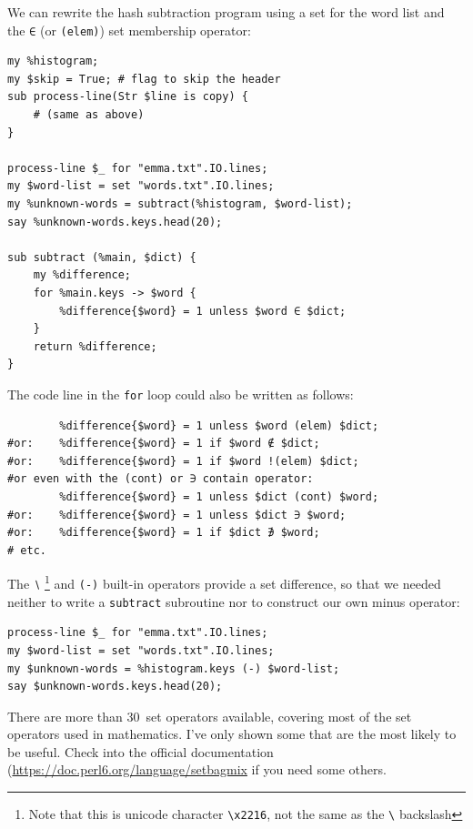 We can rewrite the hash subtraction program using a set for 
the word list and the  \verb'∈' (or \verb'(elem)') 
set membership operator:

\begin{verbatim}
my %histogram;
my $skip = True; # flag to skip the header
sub process-line(Str $line is copy) {
    # (same as above)
}

process-line $_ for "emma.txt".IO.lines; 
my $word-list = set "words.txt".IO.lines;
my %unknown-words = subtract(%histogram, $word-list);
say %unknown-words.keys.head(20);

sub subtract (%main, $dict) {
	my %difference;
	for %main.keys -> $word {
		%difference{$word} = 1 unless $word ∈ $dict;
	}
	return %difference;
}
\end{verbatim}

The code line in the {\tt for} loop could also be written as follows:

\begin{verbatim}
        %difference{$word} = 1 unless $word (elem) $dict;
#or:    %difference{$word} = 1 if $word ∉ $dict;
#or:    %difference{$word} = 1 if $word !(elem) $dict;
#or even with the (cont) or ∋ contain operator:
        %difference{$word} = 1 unless $dict (cont) $word;
#or:    %difference{$word} = 1 unless $dict ∋ $word;
#or:    %difference{$word} = 1 if $dict ∌ $word;
# etc.
\end{verbatim}

The \verb'∖' \footnote{Note that this is unicode character \verb'\x2216', 
not the same as the \verb'\' backslash} and \verb'(-)' built-in operators 
provide a set difference, so that we needed neither to write a 
{\tt subtract} subroutine nor to construct our own minus operator:

\begin{verbatim}
process-line $_ for "emma.txt".IO.lines; 
my $word-list = set "words.txt".IO.lines;
my $unknown-words = %histogram.keys (-) $word-list;
say $unknown-words.keys.head(20);
\end{verbatim}

There are more than 30~set operators available, covering most of 
the set operators used in mathematics. I've only shown 
some that are the most likely to be useful. Check into the 
official documentation (\url{https://doc.perl6.org/language/setbagmix} 
if you need some others.

